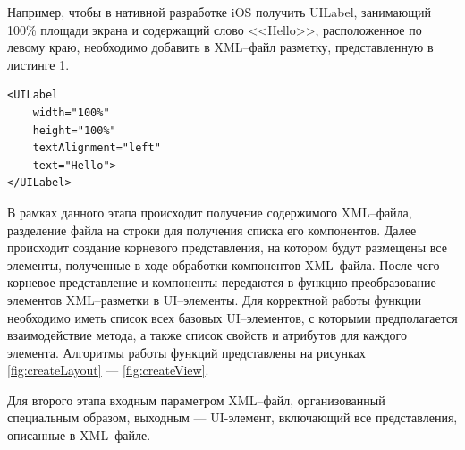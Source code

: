 Например, чтобы в нативной разработке iOS получить UILabel, занимающий 100\% площади экрана и содержащий слово <<Hello>>, расположенное по левому краю, необходимо добавить в XML--файл разметку, представленную в листинге 1.

\begin{lstlisting}[caption={Разметка XML--файла для UILabel}]
<UILabel
    width="100%"
    height="100%"
    textAlignment="left"
    text="Hello">
</UILabel>
\end{lstlisting}

В рамках данного этапа происходит получение содержимого XML--файла, разделение файла на строки для получения списка его компонентов.
Далее происходит создание корневого представления, на котором будут размещены все элементы, полученные в ходе обработки компонентов XML--файла.
После чего корневое представление и компоненты передаются в функцию преобразование элементов XML--разметки в UI--элементы.
Для корректной работы функции необходимо иметь список всех базовых UI--элементов, с которыми предполагается взаимодействие метода, а также список свойств и атрибутов для каждого элемента.
Алгоритмы работы функций представлены на рисунках \ref{fig:createLayout} ---  \ref{fig:createView}.  

Для второго этапа входным параметром XML--файл, организованный специальным образом, выходным --- UI-элемент, включающий все представления, описанные в XML--файле.

